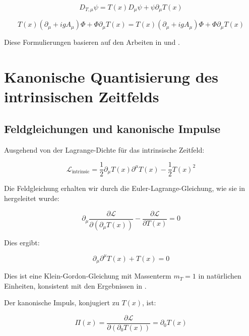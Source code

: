 \documentclass[12pt,a4paper]{article}
\newcommand{\Tfield}{T(x)}
\newcommand{\DhiggsT}{\Tfield (\partial_\mu + ig A_\mu) \Phi + \Phi \partial_\mu \Tfield}
\newcommand{\DTmu}{D_{T,\mu}}
\newcommand{\calL}{\mathcal{L}}
\begin{document}
	\begin{equation}
		\DTmu\psi = \Tfield D_{\mu}\psi + \psi\partial_{\mu}\Tfield
	\end{equation}
	
	\begin{equation}
		\DhiggsT = \Tfield(\partial_{\mu} + igA_{\mu})\Phi + \Phi\partial_{\mu}\Tfield
	\end{equation}
	
	Diese Formulierungen basieren auf den Arbeiten in \cite{pascher_formalismen_2025} und \cite{pascher_higgs_2025}.
	
	\section{Kanonische Quantisierung des intrinsischen Zeitfelds}
	\label{sec:kanonische_quantisierung}
	
	\subsection{Feldgleichungen und kanonische Impulse}
	\label{sec:feldgleichungen}
	
	Ausgehend von der Lagrange-Dichte für das intrinsische Zeitfeld:
	
	\begin{equation}
		\calL_{\text{intrinsic}} = \frac{1}{2}\partial_{\mu}\Tfield\partial^{\mu}\Tfield - \frac{1}{2}\Tfield^2
	\end{equation}
	
	Die Feldgleichung erhalten wir durch die Euler-Lagrange-Gleichung, wie sie in \cite{pascher_lagrange_2025} hergeleitet wurde:
	
	\begin{equation}
		\partial_{\mu}\frac{\partial\calL}{\partial(\partial_{\mu}\Tfield)} - \frac{\partial\calL}{\partial \Tfield} = 0
	\end{equation}
	
	Dies ergibt:
	
	\begin{equation}
		\partial_{\mu}\partial^{\mu}\Tfield + \Tfield = 0
	\end{equation}
	
	Dies ist eine Klein-Gordon-Gleichung mit Massenterm $m_T = 1$ in natürlichen Einheiten, konsistent mit den Ergebnissen in \cite{pascher_feldtheorie_2025}.
	
	Der kanonische Impuls, konjugiert zu $\Tfield$, ist:
	
	\begin{equation}
		\Pi(x) = \frac{\partial\calL}{\partial(\partial_0 \Tfield)} = \partial_0 \Tfield
	\end{equation}
	
\end{document}

